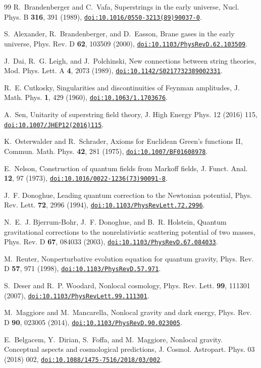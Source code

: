 \documentclass[aps,prd,10pt,twocolumn,superscriptaddress,nofootinbib,floatfix,longbibliography]{revtex4-2}
\newcommand{\doilink}[1]{\href{https://doi.org/#1}{\nolinkurl{doi:#1}}}
\begin{document}
\begin{thebibliography}{99}
R.~Brandenberger and C.~Vafa, Superstrings in the early universe, Nucl. Phys. B \textbf{316}, 391 (1989), \doilink{10.1016/0550-3213(89)90037-0}.

S.~Alexander, R.~Brandenberger, and D.~Easson, Brane gases in the early universe, Phys. Rev. D \textbf{62}, 103509 (2000), \doilink{10.1103/PhysRevD.62.103509}.

J.~Dai, R.~G. Leigh, and J.~Polchinski, New connections between string theories, Mod. Phys. Lett. A \textbf{4}, 2073 (1989), \doilink{10.1142/S0217732389002331}.

R.~E. Cutkosky, Singularities and discontinuities of Feynman amplitudes, J. Math. Phys. \textbf{1}, 429 (1960), \doilink{10.1063/1.1703676}.

A.~Sen, Unitarity of superstring field theory, J. High Energy Phys. 12 (2016) 115, \doilink{10.1007/JHEP12(2016)115}.

K.~Osterwalder and R.~Schrader, Axioms for Euclidean Green's functions II, Commun. Math. Phys. \textbf{42}, 281 (1975), \doilink{10.1007/BF01608978}.

E.~Nelson, Construction of quantum fields from Markoff fields, J. Funct. Anal. \textbf{12}, 97 (1973), \doilink{10.1016/0022-1236(73)90091-8}.

J.~F. Donoghue, Leading quantum correction to the Newtonian potential, Phys. Rev. Lett. \textbf{72}, 2996 (1994), \doilink{10.1103/PhysRevLett.72.2996}.

N.~E.~J. Bjerrum-Bohr, J.~F. Donoghue, and B.~R. Holstein, Quantum gravitational corrections to the nonrelativistic scattering potential of two masses, Phys. Rev. D \textbf{67}, 084033 (2003), \doilink{10.1103/PhysRevD.67.084033}.

M.~Reuter, Nonperturbative evolution equation for quantum gravity, Phys. Rev. D \textbf{57}, 971 (1998), \doilink{10.1103/PhysRevD.57.971}.

S.~Deser and R.~P. Woodard, Nonlocal cosmology, Phys. Rev. Lett. \textbf{99}, 111301 (2007), \doilink{10.1103/PhysRevLett.99.111301}.

M.~Maggiore and M.~Mancarella, Nonlocal gravity and dark energy, Phys. Rev. D \textbf{90}, 023005 (2014), \doilink{10.1103/PhysRevD.90.023005}.

E.~Belgacem, Y.~Dirian, S.~Foffa, and M.~Maggiore, Nonlocal gravity. Conceptual aspects and cosmological predictions, J. Cosmol. Astropart. Phys. 03 (2018) 002, \doilink{10.1088/1475-7516/2018/03/002}.

\end{thebibliography}
\end{document}
